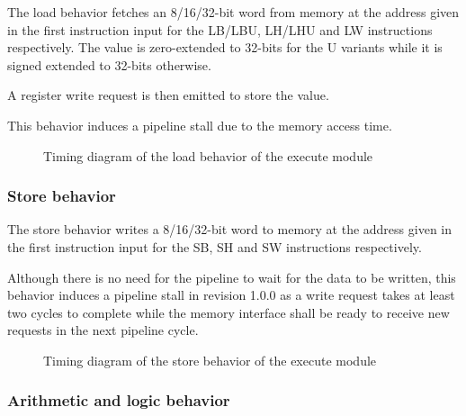       \begin{content}
          The load behavior fetches an 8/16/32-bit word from memory at the address given in the first instruction input for the LB/LBU, LH/LHU and LW instructions respectively. The value is zero-extended to 32-bits for the U variants while it is signed extended to 32-bits otherwise. 
          
          A register write request is then emitted to store the value. 
          
          This behavior induces a pipeline stall due to the memory access time.
        \end{content}

      \begin{figure}[H]
          \centering
          
          \caption{Timing diagram of the load behavior of the execute module}
          \label{fig:exm-behavior-load}
        \end{figure}

      

    \subsubsection{Store behavior}

      \begin{content}
          The store behavior writes a 8/16/32-bit word to memory at the address given in the first instruction input for the SB, SH and SW instructions respectively.

          Although there is no need for the pipeline to wait for the data to be written, this behavior induces a pipeline stall in revision 1.0.0 as a write request takes at least two cycles to complete while the memory interface shall be ready to receive new requests in the next pipeline cycle.
        \end{content}

      \begin{figure}[H]
          \centering
          
          \caption{Timing diagram of the store behavior of the execute module}
          \label{fig:exm-behavior-store}
        \end{figure}

      

    \subsubsection{Arithmetic and logic behavior}

